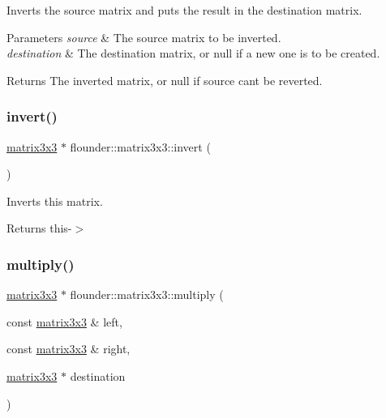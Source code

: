 Inverts the source matrix and puts the result in the destination matrix. 


\begin{DoxyParams}{Parameters}
{\em source} & The source matrix to be inverted. \\
\hline
{\em destination} & The destination matrix, or null if a new one is to be created. \\
\hline
\end{DoxyParams}
\begin{DoxyReturn}{Returns}
The inverted matrix, or null if source can\textquotesingle{}t be reverted. 
\end{DoxyReturn}
\mbox{\label{classflounder_1_1matrix3x3_add38efb997787cf7e335ad35f8f34311}} 
\subsubsection{\texorpdfstring{invert()}{invert()}\hspace{0.1cm}{\footnotesize\ttfamily [2/2]}}
{\footnotesize\ttfamily \hyperlink{classflounder_1_1matrix3x3}{matrix3x3} $\ast$ flounder\+::matrix3x3\+::invert (\begin{DoxyParamCaption}{ }\end{DoxyParamCaption})}



Inverts this matrix. 

\begin{DoxyReturn}{Returns}
this-\/$>$ 
\end{DoxyReturn}
\mbox{\label{classflounder_1_1matrix3x3_a7c46f7546804f85fc8d8c55f39c044fd}} 
\subsubsection{\texorpdfstring{multiply()}{multiply()}}
{\footnotesize\ttfamily \hyperlink{classflounder_1_1matrix3x3}{matrix3x3} $\ast$ flounder\+::matrix3x3\+::multiply (\begin{DoxyParamCaption}\item[{const \hyperlink{classflounder_1_1matrix3x3}{matrix3x3} \&}]{left,  }\item[{const \hyperlink{classflounder_1_1matrix3x3}{matrix3x3} \&}]{right,  }\item[{\hyperlink{classflounder_1_1matrix3x3}{matrix3x3} $\ast$}]{destination }\end{DoxyParamCaption})\hspace{0.3cm}{\ttfamily [static]}}



